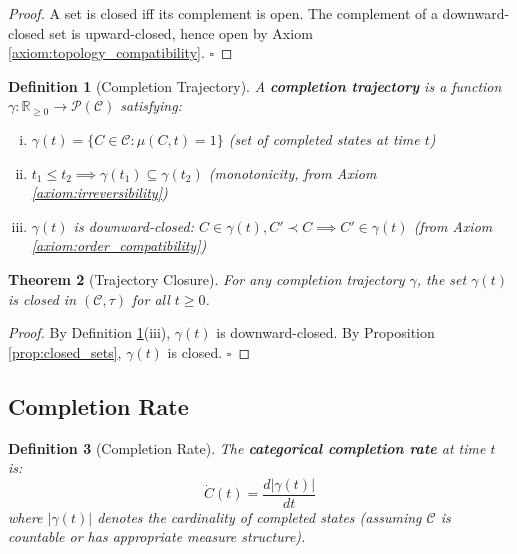 \documentclass[12pt,a4paper]{article}
\newtheorem{theorem}{Theorem}[section]
\newtheorem{definition}[theorem]{Definition}
\begin{document}
\begin{proof}
A set is closed iff its complement is open. The complement of a downward-closed set is upward-closed, hence open by Axiom \ref{axiom:topology_compatibility}. $\square$
\end{proof}

\begin{definition}[Completion Trajectory]
\label{def:completion_trajectory}
A \textbf{completion trajectory} is a function $\gamma: \mathbb{R}_{\geq 0} \to \mathcal{P}(\mathcal{C})$ satisfying:
\begin{enumerate}[(i)]
\item $\gamma(t) = \{C \in \mathcal{C} : \mu(C, t) = 1\}$ (set of completed states at time $t$)
\item $t_1 \leq t_2 \implies \gamma(t_1) \subseteq \gamma(t_2)$ (monotonicity, from Axiom \ref{axiom:irreversibility})
\item $\gamma(t)$ is downward-closed: $C \in \gamma(t), C' \prec C \implies C' \in \gamma(t)$ (from Axiom \ref{axiom:order_compatibility})
\end{enumerate}
\end{definition}

\begin{theorem}[Trajectory Closure]
\label{thm:trajectory_closure}
For any completion trajectory $\gamma$, the set $\gamma(t)$ is closed in $(\mathcal{C}, \tau)$ for all $t \geq 0$.
\end{theorem}

\begin{proof}
By Definition \ref{def:completion_trajectory}(iii), $\gamma(t)$ is downward-closed. By Proposition \ref{prop:closed_sets}, $\gamma(t)$ is closed. $\square$
\end{proof}

\subsection{Completion Rate}

\begin{definition}[Completion Rate]
\label{def:completion_rate}
The \textbf{categorical completion rate} at time $t$ is:
\begin{equation}
\dot{C}(t) = \frac{d|\gamma(t)|}{dt}
\end{equation}
where $|\gamma(t)|$ denotes the cardinality of completed states (assuming $\mathcal{C}$ is countable or has appropriate measure structure).
\end{definition}
\end{document}
